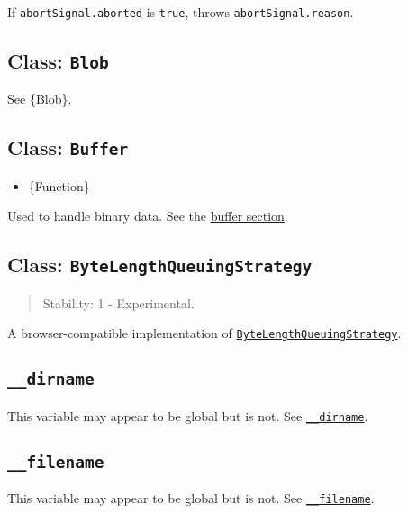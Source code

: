 If \texttt{abortSignal.aborted} is \texttt{true}, throws
\texttt{abortSignal.reason}.

\subsection{\texorpdfstring{Class:
\texttt{Blob}}{Class: Blob}}\label{class-blob}

See \{Blob\}.

\subsection{\texorpdfstring{Class:
\texttt{Buffer}}{Class: Buffer}}\label{class-buffer}

\begin{itemize}
\tightlist
\item
  \{Function\}
\end{itemize}

Used to handle binary data. See the \href{buffer.md}{buffer section}.

\subsection{\texorpdfstring{Class:
\texttt{ByteLengthQueuingStrategy}}{Class: ByteLengthQueuingStrategy}}\label{class-bytelengthqueuingstrategy}

\begin{quote}
Stability: 1 - Experimental.
\end{quote}

A browser-compatible implementation of
\href{webstreams.md\#class-bytelengthqueuingstrategy}{\texttt{ByteLengthQueuingStrategy}}.

\subsection{\texorpdfstring{\texttt{\_\_dirname}}{\_\_dirname}}\label{dirname}

This variable may appear to be global but is not. See
\href{modules.md\#__dirname}{\texttt{\_\_dirname}}.

\subsection{\texorpdfstring{\texttt{\_\_filename}}{\_\_filename}}\label{filename}

This variable may appear to be global but is not. See
\href{modules.md\#__filename}{\texttt{\_\_filename}}.

